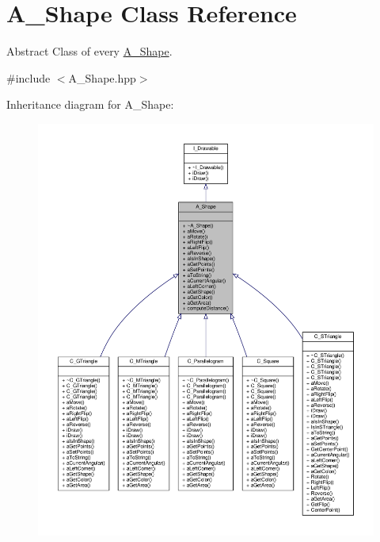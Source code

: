 \hypertarget{classA__Shape}{}\section{A\+\_\+\+Shape Class Reference}
\label{classA__Shape}


Abstract Class of every \hyperlink{classA__Shape}{A\+\_\+\+Shape}.  




{\ttfamily \#include $<$A\+\_\+\+Shape.\+hpp$>$}



Inheritance diagram for A\+\_\+\+Shape\+:\nopagebreak
\begin{figure}[H]
\begin{center}
\leavevmode
\includegraphics[width=350pt]{classA__Shape__inherit__graph}
\end{center}
\end{figure}


